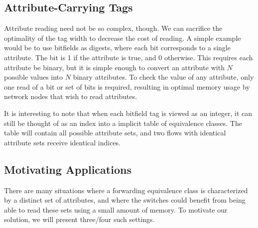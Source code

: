 





\subsection{Attribute-Carrying Tags}

Attribute reading need not be so complex, though. We can sacrifice the optimality of the tag width to decrease the cost of reading. A simple example would be to use bitfields as digests, where each bit corresponds to a single attribute. The bit is 1 if the attribute is true, and 0 otherwise. This requires each attribute be binary, but it is simple enough to convert an attribute with $N$ possible values into $N$ binary attributes.
To check the value of any attribute, only one read of a bit or set of bits is required, resulting in optimal memory usage by network nodes that wish to read attributes. 

 It is interesting to note that when each bitfield tag is viewed as an integer, it can still be thought of as an index into a implicit table of equivalence classes. The table will contain all possible attribute sets, and two flows with identical attribute sets receive identical indices. 



\subsection{Motivating Applications}
There are many situations where a forwarding equivalence class is characterized by a distinct set of attributes, and where the switches could benefit from being able to read these sets using a small amount of memory. To motivate our solution, we will present three/four such settings. 


